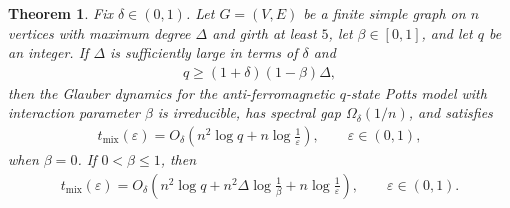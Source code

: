 \documentclass[10pt,a4paper]{amsart}
\newtheorem{theorem}{Theorem}
\begin{document}
\begin{theorem}%
\label{thm:Potts}
Fix $\delta\in(0,1)$.  Let $G=(V,E)$ be a finite simple graph on $n$
vertices with maximum degree $\Delta$ and girth at least $5$, let
$\beta\in[0,1]$, and let $q$ be an integer.  If $\Delta$ is
sufficiently large in terms of $\delta$ and
\begin{align*}
  q\geq(1+\delta)(1-\beta)\Delta,
\end{align*}
then the Glauber dynamics for the anti-ferromagnetic $q$-state Potts
model with interaction parameter $\beta$ is irreducible, has spectral
gap $\Omega_\delta(1/n)$, and satisfies
\begin{align} \label{eq:spectral-gap-mixing-bound}
  t_{\mathrm{mix}}(\varepsilon)
  =
  O_\delta\left(
    n^2\log q+n\log\frac1\varepsilon
  \right),
  \qquad
  \varepsilon\in(0,1),
\end{align}
when $\beta=0$.  If $0<\beta\leq1$, then
\begin{align*}
  t_{\mathrm{mix}}(\varepsilon)
  =
  O_\delta\left(
    n^2\log q+n^2\Delta\log\frac1\beta
    +n\log\frac1\varepsilon
  \right),
  \qquad
  \varepsilon\in(0,1).
\end{align*}
\end{theorem}
\end{document}
